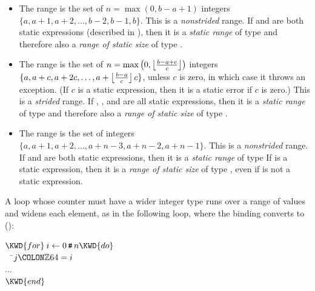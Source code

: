\begin{itemize}
\item The range  is the set of $n=\max(0,b-a+1)$ integers $\{a, a+1, a+2, \ldots, b-2, b-1, b\}$.
This is a \emph{nonstrided} range.
If  and  are both static expressions
(described in ),
then it is a \emph{static range} of type 
and therefore also a \emph{range of static size} of type .

\item The range  is
the set of $n=\max\left(0, \left\lfloor {b-a+c \over c} \right\rfloor \right)$ integers
$\{a, a+c, a+2c, \ldots, a + \left\lfloor {b-a \over c} \right\rfloor c\}$,
unless $c$ is zero, in which case it throws an exception.
(If $c$ is a static expression, then it is a static error if $c$ is zero.)
This is a \emph{strided} range.
If , , and  are all static expressions,
then it is a \emph{static range} of type 
and therefore also a \emph{range of static size} of type .

\item The range  is the set of
 integers $\{a, a+1, a+2, \ldots, a+n-3, a+n-2, a+n-1\}$.
This is a \emph{nonstrided} range.
If  and  are both static expressions,
then it is a \emph{static range} of type 
If  is a static expression, then it is a \emph{range of static size}
of type ,
even if  is not a static expression.
\end{itemize}

A loop whose counter must have a wider integer type runs over a range of
 values and widens each element, as in the following
loop, where the binding converts  to 
():
\begin{Fortress}
\(\KWD{for}\:i \leftarrow 0\mathinner{\hbox{\tt\char'43}}n \KWD{do}\)\\
{\tt~~}\pushtabs\=\+\(  j\COLON \mathbb{Z}64 = i\)\\
\(  \ldots\)\-\\\poptabs
\(\KWD{end}\)
\end{Fortress}

